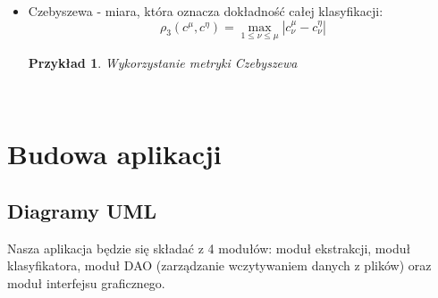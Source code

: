 \documentclass{classrep}
\newtheorem{exmp}{Przykład}[section]
\begin{document}
\begin{itemize}
    \item Czebyszewa - miara, która oznacza dokładność całej klasyfikacji:
    \begin{equation}
        \rho_{3}(c^\mu, c^\eta) = \max\limits_{1 \leq \nu \leq \mu}
        |c_{\nu}^\mu - c_{\nu}^\eta| 
    \end{equation}
    \begin{exmp} Wykorzystanie metryki Czebyszewa  \\

    \end{exmp}
\end{itemize}
 \\ 


\section{Budowa aplikacji}
\subsection{Diagramy UML}
Nasza aplikacja będzie się składać z 4 modułów: moduł ekstrakcji, moduł klasyfikatora, moduł DAO (zarządzanie wczytywaniem danych z plików) oraz moduł interfejsu graficznego. 
\end{document}
